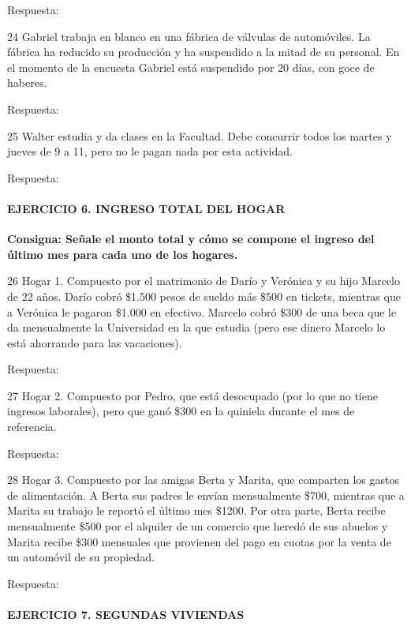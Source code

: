 \documentclass[
  openany]{book}
\begin{document}
Respuesta:

24 Gabriel trabaja en blanco en una fábrica de válvulas de automóviles. La fábrica ha reducido su producción y ha suspendido a la mitad de su personal. En el momento de la encuesta Gabriel está suspendido por 20 días, con goce de haberes.

Respuesta:

25 Walter estudia y da clases en la Facultad. Debe concurrir todos los martes y jueves de 9 a 11, pero no le pagan nada por esta actividad.

Respuesta:

\hypertarget{ejercicio-6.-ingreso-total-del-hogar}{%
\paragraph{\texorpdfstring{\textbf{EJERCICIO 6. INGRESO TOTAL DEL HOGAR}}{EJERCICIO 6. INGRESO TOTAL DEL HOGAR}}\label{ejercicio-6.-ingreso-total-del-hogar}}

\textbf{Consigna: Señale el monto total y cómo se compone el ingreso del último mes para cada uno de los hogares.}

26 Hogar 1. Compuesto por el matrimonio de Darío y Verónica y su hijo Marcelo de 22 años. Darío cobró \$1.500 pesos de sueldo más \$500 en tickets, mientras que a Verónica le pagaron \$1.000 en efectivo. Marcelo cobró \$300 de una beca que le da mensualmente la Universidad en la que estudia (pero ese dinero Marcelo lo está ahorrando para las vacaciones).

Respuesta:

27 Hogar 2. Compuesto por Pedro, que está desocupado (por lo que no tiene ingresos laborales), pero que ganó \$300 en la quiniela durante el mes de referencia.

Respuesta:

28 Hogar 3. Compuesto por las amigas Berta y Marita, que comparten los gastos de alimentación. A Berta sus padres le envían mensualmente \$700, mientras que a Marita su trabajo le reportó el último mes \$1200. Por otra parte, Berta recibe mensualmente \$500 por el alquiler de un comercio que heredó de sus abuelos y Marita recibe \$300 mensuales que provienen del pago en cuotas por la venta de un automóvil de su propiedad.

Respuesta:

\hypertarget{ejercicio-7.-segundas-viviendas}{%
\paragraph{\texorpdfstring{\textbf{EJERCICIO 7. SEGUNDAS VIVIENDAS}}{EJERCICIO 7. SEGUNDAS VIVIENDAS}}\label{ejercicio-7.-segundas-viviendas}}
\end{document}
